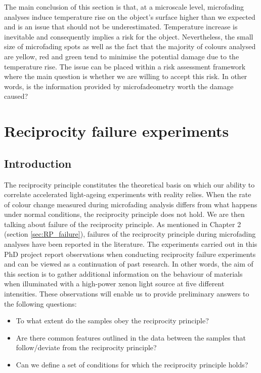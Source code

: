The main conclusion of this section is that, at a microscale level, microfading analyses induce temperature rise on the object’s surface higher than we expected and is an issue that should not be underestimated. Temperature increase is inevitable and consequently implies a risk for the object. Nevertheless, the small size of microfading spots as well as the fact that the majority of colours analysed are yellow, red and green tend to minimise the potential damage due to the temperature rise. The issue can be placed within a risk assessment framework where the main question is whether we are willing to accept this risk. In other words, is the information provided by microfadeometry worth the damage caused?


\newpage

\section{Reciprocity failure experiments}
\label{sec:MFT-reciprocity}


\subsection{Introduction}

The reciprocity principle constitutes the theoretical basis on which our ability to correlate accelerated light-ageing experiments with reality relies. When the rate of colour change measured during microfading analysis differs from what happens under normal conditions, the reciprocity principle does not hold. We are then talking about failure of the reciprocity principle. As mentioned in Chapter 2 (section \ref{sec:RP_failure}), failures of the reciprocity principle during microfading analyses have been reported in the literature. The experiments carried out in this PhD project report observations when conducting reciprocity failure experiments and can be viewed as a continuation of past research. In other words, the aim of this section is to gather additional information on the behaviour of materials when illuminated with a high-power xenon light source at five different intensities. These observations will enable us to provide preliminary answers to the following questions:\\
\begin{itemize}
    \item To what extent do the samples obey the reciprocity principle?
    \item Are there common features outlined in the data between the samples that follow/deviate from the reciprocity principle?
    \item Can we define a set of conditions for which the reciprocity principle holds?
\end{itemize}
 
